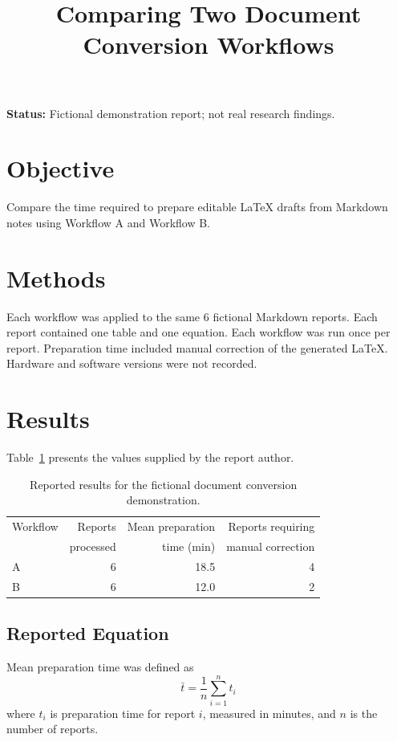 \documentclass[11pt]{article}
\title{Comparing Two Document Conversion Workflows}
\author{}
\date{}
\begin{document}
\maketitle

\noindent\textbf{Status:} Fictional demonstration report; not real research findings.

\section{Objective}
Compare the time required to prepare editable LaTeX drafts from Markdown
notes using Workflow A and Workflow B.

\section{Methods}
Each workflow was applied to the same 6 fictional Markdown reports. Each
report contained one table and one equation. Each workflow was run once
per report. Preparation time included manual correction of the generated
LaTeX. Hardware and software versions were not recorded.

\section{Results}
Table~\ref{tab:workflow-results} presents the values supplied by the report
author.

\begin{table}[htbp]
\centering
\caption{Reported results for the fictional document conversion demonstration.}
\label{tab:workflow-results}
\begin{tabular}{lrrr}
\toprule
Workflow & Reports & Mean preparation & Reports requiring \\
         & processed & time (min) & manual correction \\
\midrule
A & 6 & 18.5 & 4 \\
B & 6 & 12.0 & 2 \\
\bottomrule
\end{tabular}
\end{table}

\subsection{Reported Equation}
Mean preparation time was defined as
\begin{equation}
\bar{t} = \frac{1}{n}\sum_{i=1}^{n} t_i
\label{eq:mean-time}
\end{equation}
where \(t_i\) is preparation time for report \(i\), measured in minutes,
and \(n\) is the number of reports.
\end{document}
